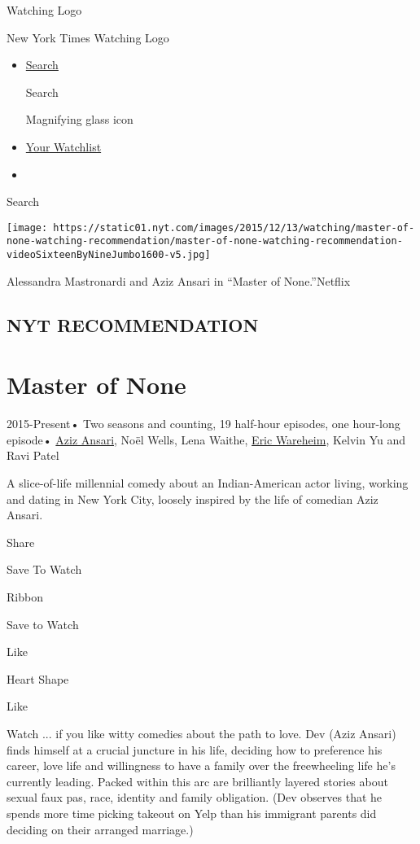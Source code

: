 \href{/watching}{}

Watching Logo

New York Times Watching Logo

\begin{itemize}
\item
  \href{/watching/search}{Search}

  Search

  Magnifying glass icon
\item
  \href{/watching/watchlist}{Your Watchlist}
\item
\end{itemize}

Search

\texttt{[image: https://static01.nyt.com/images/2015/12/13/watching/master-of-none-watching-recommendation/master-of-none-watching-recommendation-videoSixteenByNineJumbo1600-v5.jpg]}

Alessandra Mastronardi and Aziz Ansari in ``Master of None.''Netflix

\hypertarget{nyt-recommendation}{%
\subsection{NYT RECOMMENDATION}\label{nyt-recommendation}}

\hypertarget{master-of-none}{%
\section{Master of None}\label{master-of-none}}

2015-Present• Two seasons and counting, 19 half-hour episodes, one
hour-long episode•
\href{/watching/search?q=Aziz\%20Ansari\&actor=aziz-ansari}{Aziz
Ansari}, Noël Wells, Lena Waithe,
\href{/watching/search?q=Eric\%20Wareheim\&actor=eric-wareheim}{Eric
Wareheim}, Kelvin Yu and Ravi Patel

A slice-of-life millennial comedy about an Indian-American actor living,
working and dating in New York City, loosely inspired by the life of
comedian Aziz Ansari.

Share

Save To Watch

Ribbon

Save to Watch

Like

Heart Shape

Like

Watch ... if you like witty comedies about the path to love. Dev (Aziz
Ansari) finds himself at a crucial juncture in his life, deciding how to
preference his career, love life and willingness to have a family over
the freewheeling life he's currently leading. Packed within this arc are
brilliantly layered stories about sexual faux pas, race, identity and
family obligation. (Dev observes that he spends more time picking
takeout on Yelp than his immigrant parents did deciding on their
arranged marriage.)

